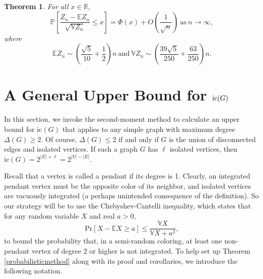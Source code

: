 \documentclass[11pt, reqno]{amsart}
\newtheorem{theorem}{Theorem} %
\theoremstyle{definition}
\renewcommand{\leq}{\leqslant}
\renewcommand{\geq}{\geqslant}
\begin{document}
\begin{theorem}
For all $x \in \mathbb{R},$
\[\mathbb{P}\left[\frac{Z_n - \mathbb{E}Z_n}{\sqrt{\mathbb{V}Z_n}} \leq x\right] = \Phi(x) + O\!\left(\frac{1}{\sqrt{n}}\right)\ \text{as}\ n \to \infty,\]
where
\[\mathbb{E}Z_n \sim \left(\frac{\sqrt{5}}{10}+\frac{1}{2}\right)n\ \text{and}\ \mathbb{V}Z_n \sim \left(\frac{39\sqrt{5}}{250} + \frac{63}{250}\right)n.\]
\end{theorem}

\section{A General Upper Bound for $\textup{ic}(G)$}

In this section, we invoke the second-moment method to calculate an upper bound for $\text{ic}(G)$ that applies to any simple graph with maximum degree $\Delta(G) \geq 2$. Of course, $\Delta(G) \leq 2$ if and only if $G$ is the union of disconnected edges and isolated vertices. If such a graph $G$ has $\ell$ isolated vertices, then $\text{ic}(G) = 2^{|E|+\ell} = 2^{|V|-|E|}.$

Recall that a vertex is called a pendant if its degree is 1. Clearly, an integrated pendant vertex must be the opposite color of its neighbor, and isolated vertices are vacuously integrated (a perhaps unintended consequence of the definition). So our strategy will be to use the Chebyshev-Cantelli inequality, which states that for any random variable $X$ and real $a > 0,$
\[\text{Pr}[X-\mathbb{E}X \geq a] \leq \frac{\mathbb{V}X}{\mathbb{V}X+a^2},
\]
to bound the probability that, in a semi-random coloring, at least one non-pendant vertex of degree 2 or higher is not integrated. To help set up Theorem \ref{probabilisticmethod} along with its proof and corollaries, we introduce the following notation.
\end{document}

